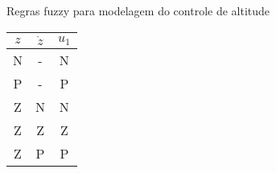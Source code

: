 \begin{quadro}[!htb]
    \centering
    \caption{Regras fuzzy para modelagem do controle de altitude\label{qua:regras_fuzzy_u1_mamdani}}
    \begin{tabular}{|c|c|c|}
        \hline
        \textbf{{$z$}} & 
        \textbf{{$\dot{z}$}} &
        \textbf{{$u_1$}} \\
        \hline %
            N &
            - &
            N \\
        \hline %
            P &
            - &
            P \\
        \hline %
            Z &
            N &
            N \\
        \hline %
            Z &
            Z &
            Z \\
        \hline %
            Z &
            P &
            P \\
        \hline
    \end{tabular}
\end{quadro}
